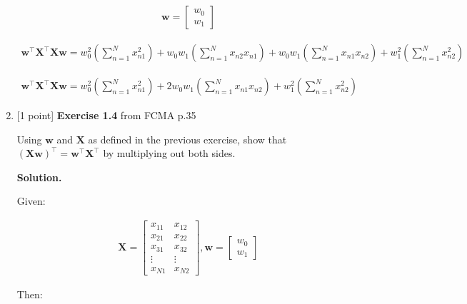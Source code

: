 \documentclass[10pt]{article}
\begin{document}
\begin{enumerate}
\begin{eqnarray*}
\mathbf{w} = 
    \begin{bmatrix}
    w_0 \\[0.3em]
    w_1
    \end{bmatrix}
\end{eqnarray*}    

\begin{eqnarray*}
\mathbf{w}^\top\mathbf{X}^\top\mathbf{X}\mathbf{w}  = 
	w_0^2   \left( {\sum_{n=1}^N x_{n1}^2}      \right) + 
	w_0 w_1 \left( {\sum_{n=1}^N x_{n2} x_{n1}} \right) + 
	w_0 w_1 \left( {\sum_{n=1}^N x_{n1} x_{n2}} \right) + 
	w_1^2   \left( {\sum_{n=1}^N x_{n2}^2}      \right)
\end{eqnarray*}

\begin{eqnarray*}
\mathbf{w}^\top\mathbf{X}^\top\mathbf{X}\mathbf{w}  = 
	w_0^2 \left( {\sum_{n=1}^N x_{n1}^2} \right) + 
	2w_0 w_1 \left( {\sum_{n=1}^N x_{n1} x_{n2}} \right) + 
	w_1^2 \left( {\sum_{n=1}^N x_{n2}^2} \right)
\end{eqnarray*}


\item \label{prob:4} [1 point]
{\bf Exercise 1.4} from FCMA p.35

Using $\mathbf{w}$ and $\mathbf{X}$ as defined in the previous exercise, show that ${(\mathbf{X}\mathbf{w})}^\top = {\mathbf{w}}^\top{\mathbf{X}}^\top$ by multiplying out both sides.

{\bf Solution.} 

Given:

\begin{eqnarray*}
	\mathbf{X} = 
    \begin{bmatrix}
    x_{11} & x_{12} \\[0.3em]
    x_{21} & x_{22} \\[0.3em]
    x_{31} & x_{32} \\[0.3em]
    \vdots & \vdots \\[0.3em]
    x_{N1} & x_{N2}
    \end{bmatrix}
    ,
    \mathbf{w} = 
    \begin{bmatrix}
    w_0 \\[0.3em]
    w_1
    \end{bmatrix}
\end{eqnarray*}

Then:


\end{enumerate}
\end{document}
